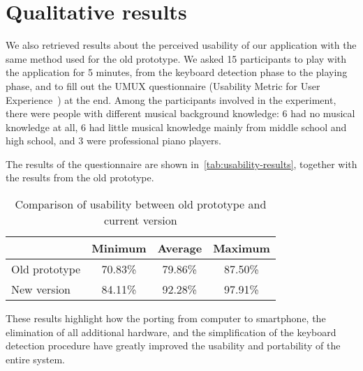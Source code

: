 \section{Qualitative results}\label{sec:qualitative-results}
We also retrieved results about the perceived usability of our application with the same method used for the old prototype.
We asked 15 participants to play with the application for 5 minutes,
from the keyboard detection phase to the playing phase, and to fill out the UMUX questionnaire
(Usability Metric for User Experience~\cite{umux}) at the end.
Among the participants involved in the experiment, there were people with different musical background knowledge:
6 had no musical knowledge at all, 6 had little musical knowledge mainly from middle school and high school,
and 3 were professional piano players.

The results of the questionnaire are shown in~\autoref{tab:usability-results},
together with the results from the old prototype.

\begin{table}[ht]
	\centering
	\begin{tabular}{l|l|l|l|}
		\cline{2-4}
		& Minimum                       & Average                       & Maximum                       \\ \hline
		\multicolumn{1}{|l|}{Old prototype} & \multicolumn{1}{|c|}{70.83\%} & \multicolumn{1}{|c|}{79.86\%} & \multicolumn{1}{|c|}{87.50\%} \\ \hline
		\multicolumn{1}{|l|}{New version}   & \multicolumn{1}{|c|}{84.11\%} & \multicolumn{1}{|c|}{92.28\%} & \multicolumn{1}{|c|}{97.91\%} \\ \hline
	\end{tabular}
	\caption{Comparison of usability between old prototype and current version}
	\label{tab:usability-results}
\end{table}

These results highlight how the porting from computer to smartphone,
the elimination of all additional hardware, and the simplification of the keyboard detection procedure
have greatly improved the usability and portability of the entire system.

